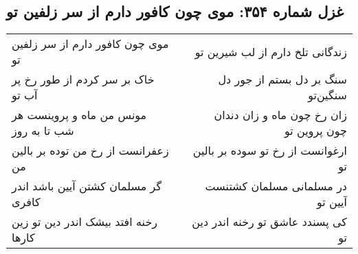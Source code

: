 \begin{center}
\section*{غزل شماره ۳۵۴: موی چون کافور دارم از سر زلفین تو}
\label{sec:354}
\begin{longtable}{l p{0.5cm} r}
موی چون کافور دارم از سر زلفین تو
&&
زندگانی تلخ دارم از لب شیرین تو
\\
خاک بر سر کردم از طور رخ پر آب تو
&&
سنگ بر دل بستم از جور دل سنگین‌تو
\\
مونس من ماه و پروینست هر شب تا به روز
&&
زان رخ چون ماه و زان دندان چون پروین تو
\\
زعفرانست از رخ من توده بر بالین من
&&
ارغوانست از رخ تو سوده بر بالین تو
\\
گر مسلمان کشتن آیین باشد اندر کافری
&&
در مسلمانی مسلمان کشتنست آیین تو
\\
رخنه افتد بیشک اندر دین تو زین کارها
&&
کی پسندد عاشق تو رخنه اندر دین تو
\\
\end{longtable}
\end{center}
